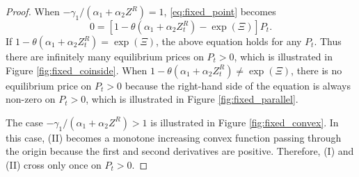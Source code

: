 \documentclass[11pt, a4paper]{article}
\begin{document}
\begin{proof}
When $-\gamma_1/(\alpha_1+\alpha_2 Z^R) = 1$, \eqref{eq:fixed_point} becomes
\[ 0 = [1 - \theta (\alpha_1 + \alpha_2 Z^{R}_{t}) - \exp(\Xi)] P_t. \]
If $ 1 - \theta (\alpha_1 + \alpha_2 Z^{R}_{t}) = \exp(\Xi)$, the above equation holds for any $P_t$. 
Thus there are infinitely many equilibrium prices on $P_t >0$, which is illustrated in Figure \ref{fig:fixed_coinside}.
When $ 1 - \theta (\alpha_1 + \alpha_2 Z^{R}_{t}) \ne \exp(\Xi)$, there is no equilibrium price on $P_t >0$ because the right-hand side of the equation is always non-zero on $P_t >0$, which is illustrated in Figure \ref{fig:fixed_parallel}.

The case $-\gamma_1/(\alpha_1+\alpha_2 Z^R) > 1$ is illustrated in Figure \ref{fig:fixed_convex}. In this case, (II) becomes a monotone increasing convex function passing through the origin because the first and second derivatives are positive. Therefore, (I) and (II) cross only once on $P_t >0$.




\end{proof}
\end{document}
